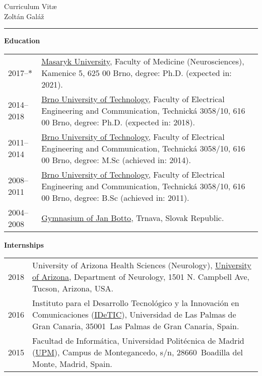 {}

\begin{center}
\LARGE Curriculum Vit\ae\\
\large Zolt\'{a}n Gal\'{a}\v{z}
\end{center}

\noindent
\rule{\linewidth}{0.2mm}

\vspace{1em}

\noindent
\textbf{Education}

\vspace{1em}

\noindent
\begin{longtable}{@{}p{2.8cm}p{11.5cm}}
 2017--$*$ & \href{https://www.muni.cz/en}{Masaryk University}, Faculty of Medicine (Neurosciences), Kamenice 5, 625 00 Brno, degree: Ph.D. (expected in: 2021). \\
 2014--2018 & \href{https://www.vutbr.cz/}{Brno University of Technology}, Faculty of Electrical Engineering and Communication, Technick\'{a} 3058/10, 616 00 Brno, degree: Ph.D. (expected in: 2018). \\
 2011--2014 & \href{https://www.vutbr.cz/}{Brno University of Technology}, Faculty of Electrical Engineering and Communication, Technick\'{a} 3058/10, 616 00 Brno, degree: M.Sc (achieved in: 2014). \\
 2008--2011 & \href{https://www.vutbr.cz/}{Brno University of Technology}, Faculty of Electrical Engineering and Communication, Technick\'{a} 3058/10, 616 00 Brno, degree: B.Sc (achieved in: 2011). \\
 2004--2008 & \href{https://gymbott.edupage.org/}{Gymnasium of Jan Botto}, Trnava, Slovak Republic.
\end{longtable}

\vspace{1em}

\noindent
\textbf{Internships}

\vspace{1em}

\noindent
\begin{longtable}{@{}p{2.8cm}p{11.5cm}}
 2018 & University of Arizona Health Sciences (Neurology), \href{http://www.arizona.edu/}{University of Arizona}, Department of Neurology, 1501 N. Campbell Ave, Tucson, Arizona, USA. \\
 2016 & Instituto para el Desarrollo Tecnol\'{o}gico y la Innovaci\'{o}n en Comunicaciones (\href{http://www.idetic.ulpgc.es/idetic/index.php/en/}{IDeTIC}), Universidad de Las Palmas de Gran Canaria, 35001~Las Palmas de Gran Canaria, Spain. \\
 2015 & Facultad de Inform\'{a}tica, Universidad Polit\'{e}cnica de Madrid (\href{https://www.fi.upm.es/}{UPM}), Campus de Montegancedo, s/n, 28660~Boadilla del Monte, Madrid, Spain.
\end{longtable}

